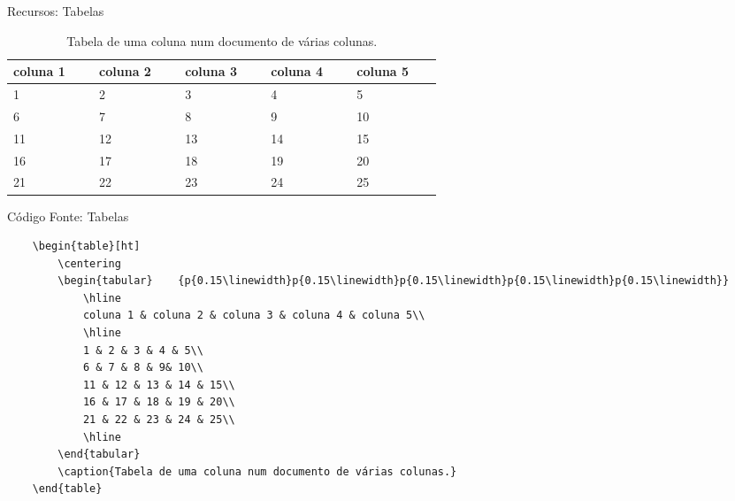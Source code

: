 \begin{frame}{Recursos: Tabelas}
    \begin{table}[ht]
        \centering
        \begin{tabular}    {p{0.15\linewidth}p{0.15\linewidth}p{0.15\linewidth}p{0.15\linewidth}p{0.15\linewidth}}
            \hline
            coluna 1 & coluna 2 & coluna 3 & coluna 4 & coluna 5\\
            \hline
            1 & 2 & 3 & 4 & 5\\
            6 & 7 & 8 & 9& 10\\
            11 & 12 & 13 & 14 & 15\\
            16 & 17 & 18 & 19 & 20\\
            21 & 22 & 23 & 24 & 25\\
            \hline
        \end{tabular}
        \caption{Tabela de uma coluna num documento de várias colunas.}
    \end{table}
\end{frame}
\begin{frame}[fragile]{Código Fonte: Tabelas}
    \begin{lstlisting}
    \begin{table}[ht]
        \centering
        \begin{tabular}    {p{0.15\linewidth}p{0.15\linewidth}p{0.15\linewidth}p{0.15\linewidth}p{0.15\linewidth}}
            \hline
            coluna 1 & coluna 2 & coluna 3 & coluna 4 & coluna 5\\
            \hline
            1 & 2 & 3 & 4 & 5\\
            6 & 7 & 8 & 9& 10\\
            11 & 12 & 13 & 14 & 15\\
            16 & 17 & 18 & 19 & 20\\
            21 & 22 & 23 & 24 & 25\\
            \hline
        \end{tabular}
        \caption{Tabela de uma coluna num documento de várias colunas.}
    \end{table}
    \end{lstlisting}
\end{frame}


